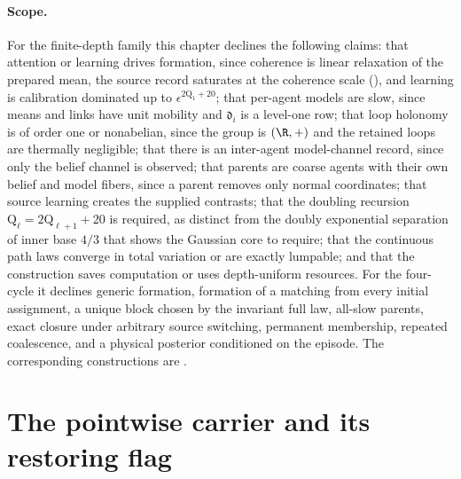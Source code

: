 \paragraph{Scope.}
For the finite-depth family this chapter declines the following claims: that
attention or learning drives formation, since coherence is linear relaxation
of the prepared mean, the source record saturates at the coherence scale
(), and learning is calibration dominated up
to \(\epsilon^{2\mathrm Q_1+20}\); that per-agent models are slow, since means
and links have unit mobility and \(\mathfrak d_i\) is a level-one row; that
loop holonomy is of order one or nonabelian, since the group is \((\R,+)\) and
the retained loops are thermally negligible; that there is an inter-agent
model-channel record, since only the belief channel is observed; that parents
are coarse agents with their own belief and model fibers, since a parent
removes only normal coordinates; that source learning creates the supplied
contrasts; that the doubling recursion \(\mathrm Q_\ell=2\mathrm Q_{\ell+1}+20\)
is required, as distinct from the doubly exponential separation of inner base
\(4/3\) that  shows the Gaussian core to
require; that the continuous path laws converge in total variation or are exactly lumpable; and
that the construction saves computation or uses depth-uniform resources. For
the four-cycle it declines generic formation, formation of a matching from
every initial assignment, a unique block chosen by the invariant full law,
all-slow parents, exact closure under arbitrary source switching, permanent
membership, repeated coalescence, and a physical posterior conditioned on the
episode. The corresponding constructions are
.

\section{The pointwise carrier and its restoring flag}
\label{sec:rg-formation-carrier}

